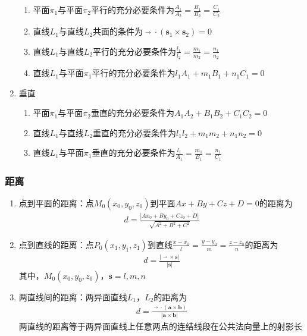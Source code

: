 \documentclass[12pt]{book}
\begin{document}
\begin{enumerate}[1.]
\begin{enumerate}[(1)]
              \item 平面$\pi_1$与平面$\pi_2$平行的充分必要条件为$\frac{A_1}{A_2}=\frac{B_1}{B_2}=\frac{C_1}{C_2}$
              \item 直线$L_1$与直线$L_2$共面的条件为$\mathop{P_{1}P_{2}}\limits^{\rightarrow}\cdot(\bm{s}_{1}\times\bm{s}_{2})=0 $
              \item 直线$L_1$与直线$L_2$平行的充分必要条件为$\frac{l_1}{l_2}=\frac{m_1}{m_2}=\frac{n_1}{n_2}$
              \item 直线$L_1$与平面$\pi_1$平行的充分必要条件为${l_1}{A_1}+{m_1}{B_1}+{n_1}{C_1}=0$
          \end{enumerate}
    \item 垂直
          \begin{enumerate}[(1)]
              \item 平面$\pi_1$与平面$\pi_2$垂直的充分必要条件为$A_{1}A_{2}+B_{1}B_{2}+C_{1}C_{2}=0$
              \item 直线$L_1$与直线$L_2$垂直的充分必要条件为$l_{1}l_{2}+m_{1}m_{2}+n_{1}n_{2}=0$
              \item 直线$L_1$与平面$\pi_1$垂直的充分必要条件为$\frac{l_1}{A_1}=\frac{m_1}{B_1}=\frac{n_1}{C_1}$
          \end{enumerate}
\end{enumerate}



\subsubsection{距离}

\begin{enumerate}[1.]
    \item 点到平面的距离：点$M_{0}(x_{0},y_0,z_0)$到平面$Ax+By+Cz+D=0$的距离为
    \begin{gather*}
        d=\frac{|Ax_{0}+By_{0}+Cz_{0}+D|}{\sqrt{A^2+B^2+C^2}}
    \end{gather*}
    \item 点到直线的距离：点$P_{0}(x_{1},y_1,z_1)$到直线$\frac{x-x_0}{l}=\frac{y-y_0}{m}=\frac{z-z_0}{n}$的距离为
    \begin{gather*}
        d=\frac{|\mathop{M_{0}P_{1}}\limits^{\rightarrow}\times\bm{s}|}{|\bm{s}|}
    \end{gather*}
    其中，$M_{0}(x_{0},y_0,z_0)$，$\bm{s}={l,m,n}$
    \item 两直线间的距离：两异面直线$L_1$，$L_2$的距离为
    \begin{gather*}
        d=\frac{\mathop{P_{1}P_{2}}\limits^{\rightarrow}\cdot(\bm{a}\times\bm{b})}{|\bm{a}\times\bm{b}|}
    \end{gather*}
    两直线的距离等于两异面直线上任意两点的连结线段在公共法向量上的射影长
    
\end{enumerate}
\end{document}
